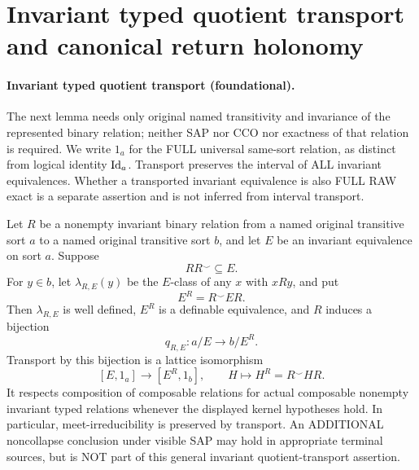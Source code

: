 \section{Invariant typed quotient transport and canonical return holonomy}
\label{sec:foundational-typed-return-holonomy}

\paragraph{Invariant typed quotient transport (foundational).}
The next lemma needs only original named transitivity and invariance of
the represented binary relation; neither SAP nor CCO nor exactness
of that relation is required. We write $1_a$ for the FULL universal
same-sort relation, as distinct from logical identity $\mathrm{Id}_a$.
Transport preserves the interval of ALL invariant equivalences.
Whether a transported invariant equivalence is also FULL RAW exact
is a separate assertion and is not inferred from interval transport.

\begin{lemma}\label{lem:typed-quotient-transport}
Let \(R\) be a nonempty invariant binary relation from a named original transitive sort \(a\) to a named original transitive sort \(b\), and let \(E\) be an invariant equivalence on sort \(a\). Suppose
\[
 RR^{\smile}\subseteq E.
\tag{QT1}\label{eq:typed-transport-kernel}
\]
For \(y\in b\), let \(\lambda_{R,E}(y)\) be the \(E\)-class of any
\(x\) with \(xRy\), and put
\[
 E^R=R^{\smile}ER.
\]
Then \(\lambda_{R,E}\) is well defined, \(E^R\) is a definable equivalence,
and \(R\) induces a bijection
\[
 q_{R,E}:a/E\longrightarrow b/E^R.
\]
Transport by this bijection is a lattice isomorphism
\[
 [E,1_a]\longrightarrow [E^R,1_b],
 \qquad H\longmapsto H^R=R^{\smile}HR.
\tag{QT2}\label{eq:typed-transport-lattice}
\]
It respects composition of composable relations for actual composable nonempty invariant typed relations whenever the displayed kernel hypotheses hold. In particular,
meet-irreducibility is preserved by transport.
An ADDITIONAL noncollapse conclusion under visible SAP
may hold in appropriate terminal sources, but is NOT part
of this general invariant quotient-transport assertion.
\end{lemma}

